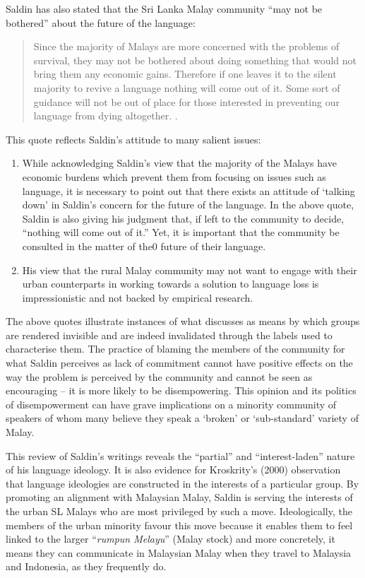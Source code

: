 Saldin has also stated that the Sri Lanka Malay community ``may not be bothered'' about the future of the language: 

\begin{quote}
Since the majority of Malays are more concerned with the problems of survival, they may not be bothered about doing something that would not bring them any economic gains. Therefore if one leaves it to the silent majority to revive a language nothing will come out of it. Some sort of guidance will not be out of place for those interested in preventing our language from dying altogether. \citep[vii]{Saldin2000}. 
\end{quote}

This quote reflects Saldin's attitude to many salient issues:

\begin{enumerate}
\item While acknowledging Saldin's view that the majority of the Malays have economic burdens which prevent them from focusing on issues such as language, it is necessary to point out that there exists an attitude of `talking down' in Saldin's concern for the future of the language.  In the above quote, Saldin is also giving his judgment that, if left to the community to decide, ``nothing will come out of it.'' Yet, it is important that the community be consulted in the matter of the0 future of their language. 
\item His view that the rural Malay community may not want to engage with their urban counterparts in working towards a solution to language loss is impressionistic and not backed by empirical research. 
\end{enumerate}
The above quotes illustrate instances of what \citet{Skutnabb-Kangas1998} discusses as means by which groups are rendered invisible and are indeed invalidated through the labels used to characterise them. The practice of blaming the members of the community for what Saldin perceives as lack of commitment cannot have positive effects on the way the problem is perceived by the community and cannot be seen as encouraging -- it is more likely to be disempowering. This opinion and its politics of disempowerment can have grave implications on a minority community of speakers of whom many believe they speak a `broken' or `sub-standard' variety of Malay.  

This review of Saldin's writings reveals the ``partial'' and ``interest-laden'' \citep{HillEtAl1992} nature of his language ideology. It is also evidence for Kroskrity's (2000) \nocite{Kroskrity2000} observation that language ideologies are constructed in the interests of a particular group. By promoting an alignment with Malaysian Malay, Saldin is serving the interests of the urban SL Malays who are most privileged by such a move. Ideologically, the members of the urban minority favour this move because it enables them to feel linked to the larger ``\textit{rumpun Melayu}'' (Malay stock) and more concretely, it means they can communicate in Malaysian Malay when they travel to Malaysia and Indonesia, as they frequently do.

